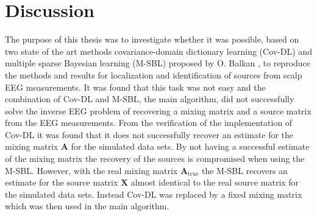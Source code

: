 \chapter{Discussion}



The purpose of this thesis was to investigate whether it was possible, based on two state of the art methods covariance-domain dictionary learning (Cov-DL) and multiple sparse Bayesian learning (M-SBL) proposed by O. Balkan \cite{Cov}\cite{M-SBL}, to reproduce the methods and results for localization and identification of sources from scalp EEG measurements. 
It was found that this task was not easy and the combination of Cov-DL and M-SBL, the main algorithm, did not successfully solve the inverse EEG problem of recovering a mixing matrix and a source matrix from the EEG measurements. 
From the verification of the implementation of Cov-DL it was found that it does not successfully recover an estimate for the mixing matrix $\mathbf{A}$ for the simulated data sets. 
By not having a successful estimate of the mixing matrix the recovery of the sources is compromised when using the M-SBL.
However, with the real mixing matrix $\mathbf{A}_{\text{true}}$ the M-SBL recovers an estimate for the source matrix $\mathbf{X}$ almost identical to the real source matrix for the simulated data sets.
Instead Cov-DL was replaced by a fixed mixing matrix which was then used in the main algorithm.


